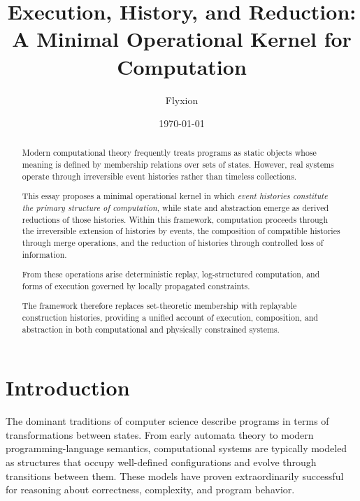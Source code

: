 \documentclass[12pt]{article}
\title{Execution, History, and Reduction:\\
A Minimal Operational Kernel for Computation}
\author{Flyxion}
\date{\today}
\begin{document}
\maketitle

\begin{abstract}

Modern computational theory frequently treats programs as static objects
whose meaning is defined by membership relations over sets of states.
However, real systems operate through irreversible event histories
rather than timeless collections.

This essay proposes a minimal operational kernel in which
\textit{event histories constitute the primary structure of computation},
while state and abstraction emerge as derived reductions of those histories.
Within this framework, computation proceeds through the irreversible
extension of histories by events, the composition of compatible histories
through merge operations, and the reduction of histories through controlled
loss of information.

From these operations arise deterministic replay,
log-structured computation, and forms of execution governed by
locally propagated constraints.

The framework therefore replaces set-theoretic membership
with replayable construction histories, providing a unified
account of execution, composition, and abstraction in both
computational and physically constrained systems.

\end{abstract}

\tableofcontents

\newpage


\section*{Introduction}

The dominant traditions of computer science describe programs
in terms of transformations between states. From early automata
theory to modern programming-language semantics, computational
systems are typically modeled as structures that occupy
well-defined configurations and evolve through transitions
between them. These models have proven extraordinarily
successful for reasoning about correctness, complexity,
and program behavior.
\end{document}

